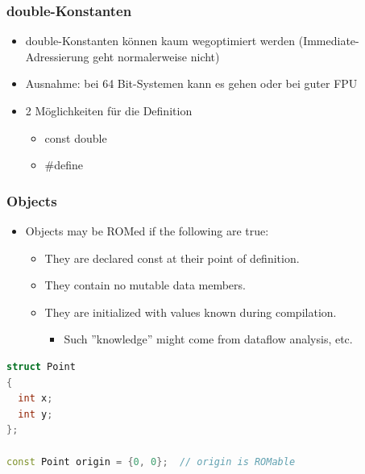 \subsubsection{double-Konstanten}
\begin{itemize}
  \item double-Konstanten können kaum wegoptimiert werden (Immediate-Adressierung geht normalerweise nicht)
  \item Ausnahme: bei 64 Bit-Systemen kann es gehen oder bei guter FPU
  \item 2 Möglichkeiten für die Definition
  \begin{itemize}
    \item const double
    \item \#define
  \end{itemize}
\end{itemize}

\subsubsection{Objects}
\begin{itemize}
  \item Objects may be ROMed if the following are true:
  \begin{itemize}
    \item They are declared const at their point of definition.
    \item They contain no mutable data members.
    \item They are initialized with values known during compilation.
    \begin{itemize}
      \item Such ''knowledge'' might come from dataflow analysis, etc.
    \end{itemize}
  \end{itemize}
\end{itemize}
\begin{lstlisting}[language=C++]
struct Point
{
  int x;
  int y;
};

const Point origin = {0, 0};  // origin is ROMable
\end{lstlisting}


